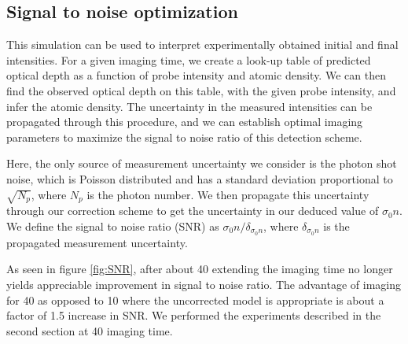 \documentclass[12pt]{iopart}
\begin{document}
\subsection{Signal to noise optimization}
This simulation can be used to interpret experimentally obtained initial and final intensities. For a given imaging time, we create a look-up table of predicted optical depth as a function of probe intensity and atomic density. We can then find the observed optical depth on this table, with the given probe intensity, and infer the atomic density. The uncertainty in the measured intensities can be propagated through this procedure, and we can establish optimal imaging parameters to maximize the signal to noise ratio of this detection scheme. 
\par Here, the only source of measurement uncertainty we consider is the photon shot noise, which is Poisson distributed and has a standard deviation proportional to $\sqrt{N_p}$, where $N_p$ is the photon number. We then propagate this uncertainty through our correction scheme to get the uncertainty in our deduced value of $\sigma_0 n$. We define the signal to noise ratio (SNR) as $\sigma_0 n/\delta_{\sigma_0 n}$, where $ \delta_{\sigma_0 n}$ is the propagated measurement uncertainty.
\par As seen in figure \ref{fig:SNR}, after about 40\us{} extending the imaging time no longer yields appreciable improvement in signal to noise ratio. The advantage of imaging for 40\us{} as opposed to 10\us{} where the uncorrected model is appropriate is about a factor of  1.5 increase in SNR. We performed the experiments described in the second section at 40\us{} imaging time.
\end{document}
